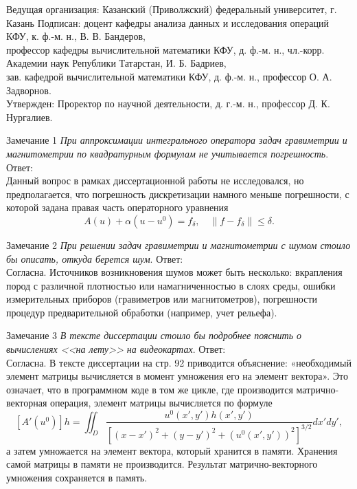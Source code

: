 \documentclass[10pt,pdf, mathserif, hyperref={unicode}]{beamer}
\begin{document}
	


\begin{frame}{Ведущая организация: 
		Казанский (Приволжский) федеральный университет, г. Казань}
Подписан:  доцент кафедры анализа данных и исследования операций КФУ,  к. ф.-м. н., В. В. Бандеров,\\
профессор кафедры вычислительной математики КФУ,  д. ф.-м. н., чл.-корр. Академии наук Републики Татарстан, И. Б. Бадриев,\\
зав. кафедрой  вычислительной математики КФУ,  д. ф.-м. н., профессор О. А. Задворнов.\\
Утвержден: Проректор по научной деятельности, д. г.-м. н., профессор Д. К. Нургалиев.

\end{frame}
\begin{frame}{Замечание 1}
	\textit {При аппроксимации интегрального оператора задач гравиметрии и магнитометрии по квадратурным формулам не учитывается погрешность}.
	\vskip 5mm
	Ответ:\\
	Данный вопрос в рамках диссертационной работы не исследовался, но предполагается, что погрешность дискретизации намного меньше погрешности, с которой задана правая часть операторного уравнения $$A(u)+\alpha(u-u^0)=f_\delta,\quad \|f-f_\delta\|\leqslant\delta.$$
\end{frame}
\begin{frame}{Замечание 2}
	\textit {При решении задач гравиметрии и магнитометрии с шумом стоило бы описать, откуда берется шум}.
	\vskip 5mm
	Ответ:\\
	Согласна. Источников возникновения шумов может быть несколько: вкрапления пород с различной плотностью или намагниченностью в слоях среды, ошибки измерительных приборов (гравиметров или магнитометров), погрешности процедур предварительной обработки (например, учет рельефа).
\end{frame}

\begin{frame}{Замечание 3}
	\textit {В тексте диссертации стоило бы подробнее пояснить о вычислениях <<на лету>> на видеокартах}.
	\vskip 5mm
	Ответ:\\
	Согласна. В тексте диссертации на стр. 92 приводится объяснение: «необходимый элемент матрицы вычисляется в момент умножения его на элемент вектора». Это означает, что в программном коде в том же цикле, где производится матрично-векторная операция, элемент матрицы вычисляется по формуле 
	$$ [A'(u^0)]h=\iint_{D} \frac{u^0(x',y')h(x',y')}{[(x-x')^2+(y-y')^2+(u^0(x',y'))^2]^{3/2}}dx'dy',$$ а затем умножается на элемент вектора, который хранится в памяти. Хранения самой матрицы в памяти не производится. Результат матрично-векторного умножения сохраняется в память.
\end{frame}
\end{document}
